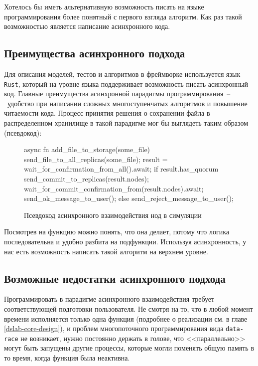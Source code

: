 Хотелось бы иметь альтернативную возможность писать на языке программирования более понятный с первого взгляда алгоритм. Как раз такой возможностью является написание асинхронного кода.


\subsection{Преимущества асинхронного подхода}

Для описания моделей, тестов и алгоритмов в фреймворке используется язык \texttt{Rust}, который на уровне языка поддерживает возможность писать асинхронный код. Главные преимущества асинхронной парадигмы программирования~--~удобство при написании сложных многоступенчатых алгоритмов и повышение читаемости кода. Процесс принятия решения о сохранении файла в распределенном хранилище в такой парадигме мог бы выглядеть таким образом (псевдокод):

\begin{figure}[H]
    \small
\begin{rustcode}
    async fn add_file_to_storage(some_file) {
        send_file_to_all_replicas(some_file);
        result = wait_for_confirmation_from_all().await;
        if result.has_quorum {
            send_commit_to_replicas(result.nodes);
            wait_for_commit_confirmation_from(result.nodes).await;
            send_ok_message_to_user();
        } else {
            send_reject_message_to_user();
        }
    }
\end{rustcode}
\caption{Псевдокод асинхронного взаимодействия нод в симуляции}
\label{pseudocode}
\end{figure}

Посмотрев на функцию можно понять, что она делает, потому что логика последовательна и удобно разбита на подфункции. Используя асинхронность, у нас есть возможность написать такой алгоритм на верхнем уровне. 

\subsection{Возможные недостатки асинхронного подхода}

Программировать в парадигме асинхронного взаимодействия требует соответствующей подготовки пользователя. Не смотря на то, что в любой момент времени исполняется только одна функция (подробнее о реализации см. в главе \ref{dslab-core-design}), и проблем многопоточного программирования вида \texttt{data-race} не возникает, нужно постоянно держать в голове, что <<параллельно>> могут быть запущены другие процессы, которые могли поменять общую память в то время, когда функция была неактивна. 

